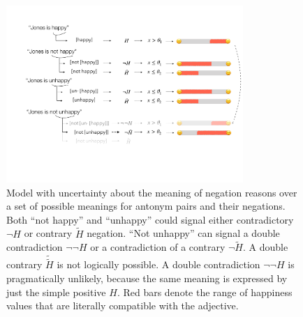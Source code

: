 \documentclass[floatsintext,doc]{apa6}
\begin{document}


\begin{figure}[t]
\centering \includegraphics[width=0.8\textwidth]{figs/schematicMeanings}  
\caption{Model with uncertainty about the meaning of negation reasons over a set of possible meanings for antonym pairs and their negations.
Both ``not happy'' and ``unhappy'' could signal either contradictory $\neg H$ or contrary $\tilde{H}$ negation.
``Not unhappy'' can signal a double contradiction  $\neg \neg H$  or a contradiction of a contrary  $ \neg \tilde{H}$. A double contrary $\tilde{\tilde{H}}$ is not logically possible. A double contradiction  $\neg \neg H$  is pragmatically unlikely, because the same meaning is expressed by just the simple positive $H$. Red bars denote the range of happiness values that are literally compatible with the adjective.}
\label{fig:meanings}
\end{figure}
\end{document}
